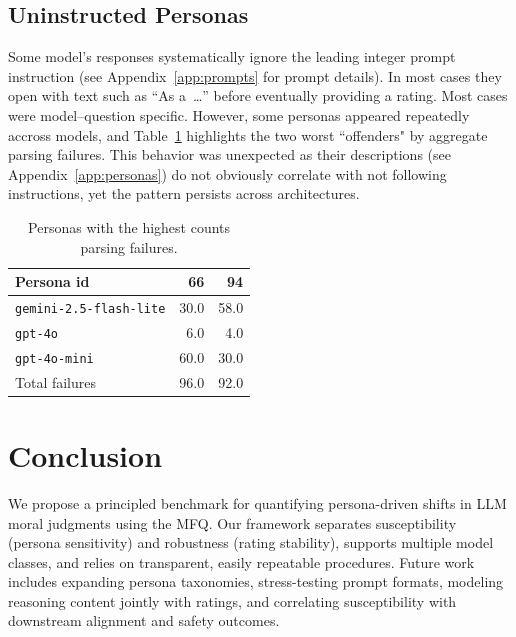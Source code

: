 \documentclass{article}
\begin{document}
\subsection{Uninstructed Personas}
\label{sec:unistructed_personas}

Some model's responses systematically ignore the leading integer prompt instruction (see Appendix~\ref{app:prompts} for prompt details). In most cases they open with text such as ``As a~\ldots'' before eventually providing a rating. Most cases were model--question specific. However, some personas appeared repeatedly accross models, and Table~\ref{tab:uninstructed-personas} highlights the two worst ``offenders" by aggregate parsing failures. This behavior was unexpected as their descriptions (see Appendix~\ref{app:personas}) do not obviously correlate with not following instructions, yet the pattern persists across architectures.

\begin{table}[t]
  \centering
  \caption{Personas with the highest counts parsing failures.}
  \label{tab:uninstructed-personas}
  \begin{tabular}{lrr}
    \toprule
    Persona id & 66 & 94 \\
    \midrule
    \texttt{gemini-2.5-flash-lite} & 30.0 & 58.0 \\
    \texttt{gpt-4o} & 6.0 & 4.0\\
    \texttt{gpt-4o-mini} & 60.0 & 30.0\\
    \midrule
    Total failures & 96.0 & 92.0\\
    \bottomrule
  \end{tabular}
\end{table}


\section{Conclusion}
We propose a principled benchmark for quantifying persona-driven shifts in LLM moral judgments using the MFQ. Our framework separates susceptibility (persona sensitivity) and robustness (rating stability), supports multiple model classes, and relies on transparent, easily repeatable procedures. Future work includes expanding persona taxonomies, stress-testing prompt formats, modeling reasoning content jointly with ratings, and correlating susceptibility with downstream alignment and safety outcomes.





\end{document}
